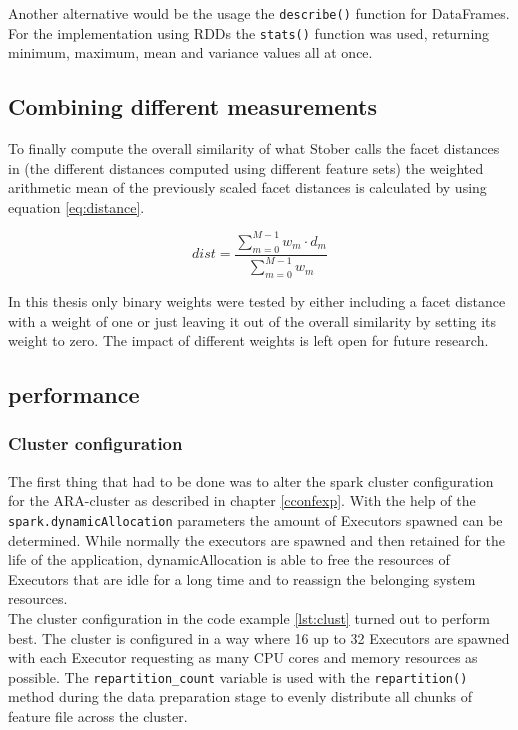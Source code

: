Another alternative would be the usage the \lstinline{describe()} function for DataFrames. For the implementation using RDDs the \lstinline{stats()} function was used, returning minimum, maximum, mean and variance values all at once. 

\subsection{Combining different measurements}\label{weighedsum}

To finally compute the overall similarity of what Stober calls the facet distances in \cite[pp. 543ff]{musicdata} (the different distances computed using different feature sets) the weighted arithmetic mean of the previously scaled facet distances is calculated by using equation \ref{eq:distance}.

\begin{equation} \label{eq:distance}
dist = \frac{\sum_{m = 0}^{M - 1}{w_m \cdot d_m}}{\sum_{m = 0}^{M - 1}{w_m}}
\end{equation}

In this thesis only binary weights were tested by either including a facet distance with a weight of one or just leaving it out of the overall similarity by setting its weight to zero. The impact of different weights is left open for future research. 

\subsection{performance}\label{sparkperf}

\subsubsection{Cluster configuration} %

The first thing that had to be done was to alter the spark cluster configuration for the ARA-cluster as described in chapter \ref{cconfexp}. With the help of the \lstinline{spark.dynamicAllocation} parameters the amount of Executors spawned can be determined. While normally the executors are spawned and then retained for the life of the application, dynamicAllocation is able to free the resources of Executors that are idle for a long time and to reassign the belonging system resources.\\
The cluster configuration in the code example \ref{lst:clust} turned out to perform best. The cluster is configured in a way where 16 up to 32 Executors are spawned with each Executor requesting as many CPU cores and memory resources as possible. 
The \lstinline{repartition_count} variable is used with the \lstinline{repartition()} method during the data preparation stage to evenly distribute all chunks of feature file across the cluster. 

